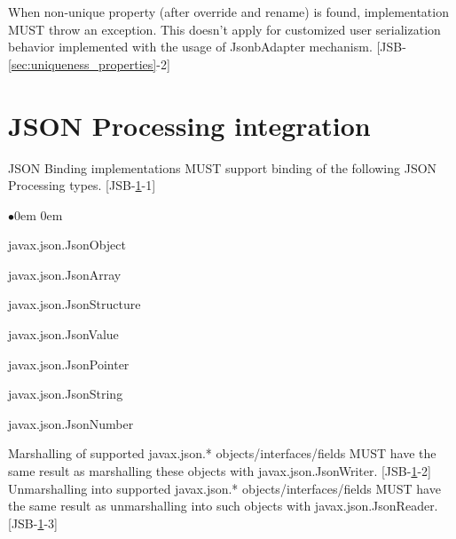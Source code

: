 When non-unique property (after override and rename) is found, implementation MUST throw an exception. This doesn't apply for customized user serialization behavior implemented with the usage of JsonbAdapter mechanism. [JSB-\ref{sec:uniqueness_properties}-2]

\section{JSON Processing integration}
\label{sec:jsonp_integration}
JSON Binding implementations MUST support binding of the following JSON Processing types. [JSB-\ref{sec:jsonp_integration}-1]

\begin{list}{$\bullet$}{\parsep 0em  0em}
\item javax.json.JsonObject
\item javax.json.JsonArray
\item javax.json.JsonStructure
\item javax.json.JsonValue
\item javax.json.JsonPointer
\item javax.json.JsonString
\item javax.json.JsonNumber
\end{list}

Marshalling of supported javax.json.* objects/interfaces/fields MUST have the same result as marshalling these objects with javax.json.JsonWriter. [JSB-\ref{sec:jsonp_integration}-2]
Unmarshalling into supported javax.json.* objects/interfaces/fields MUST have the same result as unmarshalling into such objects with javax.json.JsonReader. [JSB-\ref{sec:jsonp_integration}-3]